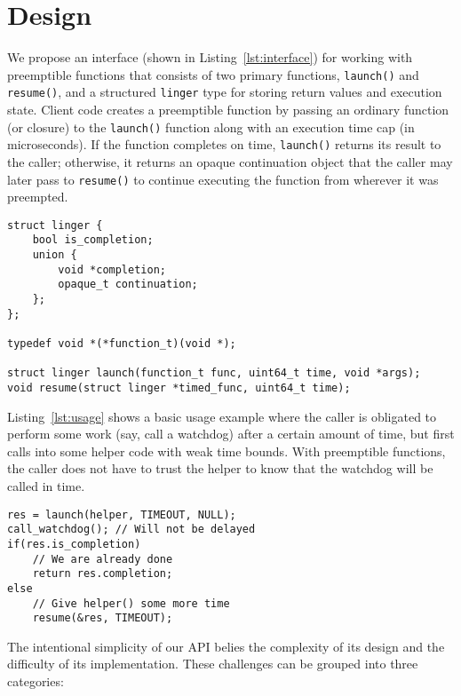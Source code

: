 \section{Design}

We propose an interface (shown in Listing~\ref{lst:interface}) for working with
preemptible functions that consists of two primary functions, \texttt{launch()} and
\texttt{resume()}, and a structured \texttt{linger} type for storing return values
and execution state.  Client code creates a preemptible function by passing an
ordinary function (or closure) to the \texttt{launch()} function along with an
execution time cap (in microseconds).  If the function completes on time,
\texttt{launch()} returns its result to the caller; otherwise, it returns an opaque
continuation object that the caller may later pass to \texttt{resume()} to continue
executing the function from wherever it was preempted.

\begin{lstlisting}[label=lst:interface,caption=Preemptible functions C-language interface]
struct linger {
	bool is_completion;
	union {
		void *completion;
		opaque_t continuation;
	};
};

typedef void *(*function_t)(void *);

struct linger launch(function_t func, uint64_t time, void *args);
void resume(struct linger *timed_func, uint64_t time);
\end{lstlisting}

Listing~\ref{lst:usage} shows a basic usage example where the caller is obligated to
perform some work (say, call a watchdog) after a certain amount of time, but first
calls into some helper code with weak time bounds.  With preemptible functions,
the caller does not have to trust the helper to know that the watchdog will be called
in time.

\begin{lstlisting}[label=lst:usage,caption=Preemptible function usage example]
res = launch(helper, TIMEOUT, NULL);
call_watchdog(); // Will not be delayed
if(res.is_completion)
	// We are already done
	return res.completion;
else
	// Give helper() some more time
	resume(&res, TIMEOUT);
\end{lstlisting}

The intentional simplicity of our API belies the complexity of its design and the
difficulty of its implementation.  These challenges can be grouped into three
categories:

